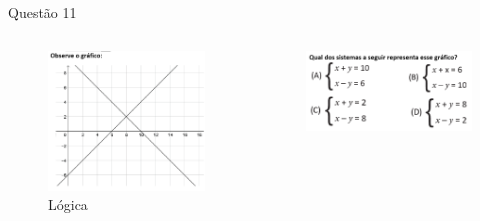 \documentclass{beamer}
\begin{document}
\begin{frame}{Questão 11}
    \begin{columns}[T] %
        \begin{column}{.6\textwidth}
            \begin{figure}
                \caption{Lógica}
                \includegraphics[scale=0.5]{qst23.10.png}
            \end{figure}
        \end{column}%
        \hfill%
        \begin{column}{.5\textwidth}
            \begin{figure}[h]
                \includegraphics[scale=0.4]{qst23.17.png}
            \end{figure}
        \end{column}%
    \end{columns}
\end{frame}
\end{document}
